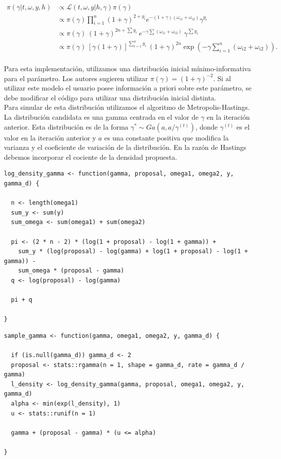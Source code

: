 \documentclass[11pt,a4paper]{article}
\begin{document}
\begin{align*}
\pi(\gamma | t, \omega, y, h) &\propto \mathcal{L}(t, \omega, y | h, \gamma) \pi(\gamma)\\
&\propto \pi(\gamma) \prod_{i = 1}^n (1+ \gamma)^{2+y_i} e^{-(1+\gamma)(\omega_{i1} + \omega_{i2})} \gamma^{y_i}\\
&\propto \pi(\gamma) \ (1+\gamma)^{2n+\sum y_i} \ e^{-\gamma\sum(\omega_{i1} + \omega_{i2})} \ \gamma^{\sum y_i}\\
&\propto \pi(\gamma) \ \left[ \gamma(1+\gamma)\right]^{\sum_{i=1}^n y_i} \ (1+\gamma)^{2n} \exp (-\gamma \sum_{i=1}^n(\omega_{i2} + \omega_{i2})).\\
\end{align*}

Para esta implementación, utilizamos una distribución inicial mínimo-informativa para el parámetro. Los autores sugieren utilizar $\pi(\gamma) = (1+\gamma)^{-2}$. Si al utilizar este modelo el usuario posee información a priori sobre este parámetro, se debe modificar el código para utilizar una distribución inicial distinta.\\

Para simular de esta distribución utilizamos el algoritmo de Metropolis-Hastings. La distribución candidata es una gamma centrada en el valor de $\gamma$ en la iteración anterior. Esta distribución es de la forma $\gamma^* \sim Ga(a, a/\gamma^{(t)})$, donde $\gamma^{(t)}$ es el valor en la iteración anterior y $a$ es una constante positiva que modifica la varianza y el coeficiente de variación de la distribución. En la razón de Hastings debemos incorporar el cociente de la densidad propuesta.\\

\begin{lstlisting}
log_density_gamma <- function(gamma, proposal, omega1, omega2, y, gamma_d) {

  n <- length(omega1)
  sum_y <- sum(y)
  sum_omega <- sum(omega1) + sum(omega2)

  pi <- (2 * n - 2) * (log(1 + proposal) - log(1 + gamma)) +
    sum_y * (log(proposal) - log(gamma) + log(1 + proposal) - log(1 + gamma)) -
    sum_omega * (proposal - gamma)
  q <- log(proposal) - log(gamma)

  pi + q

}
\end{lstlisting}

\begin{lstlisting}
sample_gamma <- function(gamma, omega1, omega2, y, gamma_d) {

  if (is.null(gamma_d)) gamma_d <- 2
  proposal <- stats::rgamma(n = 1, shape = gamma_d, rate = gamma_d / gamma)
  l_density <- log_density_gamma(gamma, proposal, omega1, omega2, y, gamma_d)
  alpha <- min(exp(l_density), 1)
  u <- stats::runif(n = 1)

  gamma + (proposal - gamma) * (u <= alpha)

}
\end{lstlisting} \leavevmode\newline
\end{document}
